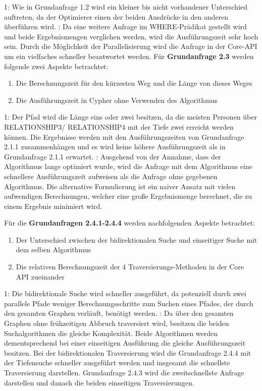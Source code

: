  1: Wie in Grundanfrage 1.2 wird ein kleiner bis nicht vorhandener Unterschied auftreten, da der Optimierer einen der beiden Ausdrücke in den anderen überführen wird. : Da eine weitere Anfrage im WHERE-Prädikat gestellt wird und beide Ergebnismengen verglichen werden, wird die Ausführungszeit sehr hoch sein. Durch die Möglichkeit der Parallelisierung wird die Anfrage in der Core-API um ein vielfaches schneller beantwortet werden. \newline  \newline
Für \textbf{Grundanfrage 2.3} werden folgende zwei Aspekte betrachtet: 
\begin{enumerate}
	\item Die Berechnungszeit für den kürzesten Weg und die Länge von dieses Weges
	\item Die Ausführungszeit in Cypher ohne Verwenden des Algorithmus
\end{enumerate}
 1: Der Pfad wird die Länge eins oder zwei besitzen, da die meisten Personen über RELATIONSHIP3/ RELATIONSHIP4 mit der Tiefe zwei erreicht werden können. Die Ergebnisse werden mit den Ausführungszeiten von Grundanfrage 2.1.1 zusammenhängen und es wird keine höhere Ausführungszeit als in Grundanfrage 2.1.1 erwartet. : Ausgehend von der Annahme, dass der Algorithmus lange optimiert wurde, wird die Anfrage mit dem Algorithmus eine schnellere Ausführungszeit aufweisen als die Anfrage ohne gegebenen Algorithmus. Die alternative Formulierung ist ein naiver Ansatz mit vielen aufwendigen Berechnungen, welcher eine große Ergebnismenge berechnet, die zu einem Ergebnis minimiert wird.   \newpage
 
Für die \textbf{Grundanfragen 2.4.1-2.4.4} werden  nachfolgenden Aspekte betrachtet:
\begin{enumerate}
	\item Der Unterschied zwischen der bidirektionalen Suche und einseitiger Suche mit dem selben Algorithmus
	\item Die relativen Berechnungszeit der 4 Traversierungs-Methoden in der Core API zueinander
\end{enumerate}
 1: Die bidirektionale Suche wird schneller ausgeführt, da potenziell durch zwei parallele Pfade  weniger Berechnungsschritte zum Suchen eines Pfades, der  durch den gesamten Graphen verläuft, benötigt werden. : Da über den gesamten Graphen ohne frühzeitigen Abbruch traversiert wird, besitzen die beiden Suchalgorithmen die gleiche Komplexität. Beide Algorithmen werden dementsprechend bei einer einseitigen Ausführung die gleiche Ausführungszeit besitzen. Bei der bidirektionalen Traversierung wird die Grundanfrage 2.4.4 mit der Tiefensuche schneller ausgeführt werden und insgesamt die schnellste Traversierung darstellen. Grundanfrage 2.4.3  wird die zweitschnellste Anfrage darstellen und danach die beiden einseitigen Traversierungen. 
